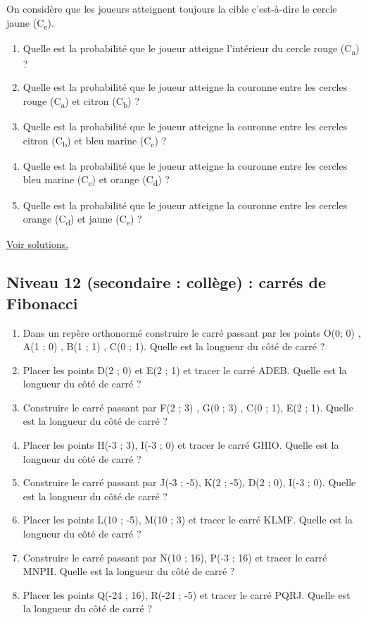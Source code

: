 \documentclass[11pt]{article}
\begin{document}
On considère que les joueurs atteignent toujours la cible c'est-à-dire
le cercle jaune (C\textsubscript{e}).


\begin{enumerate}
\item Quelle est la probabilité que le joueur atteigne l'intérieur du
cercle rouge (C\textsubscript{a}) ?
\item Quelle est la probabilité que le joueur atteigne la couronne entre
les cercles rouge (C\textsubscript{a}) et citron (C\textsubscript{b}) ?
\item Quelle est la probabilité que le joueur atteigne la couronne entre
les cercles citron (C\textsubscript{b}) et bleu marine (C\textsubscript{c}) ?
\item Quelle est la probabilité que le joueur atteigne la couronne entre
les cercles bleu marine (C\textsubscript{c}) et orange (C\textsubscript{d}) ?
\item Quelle est la probabilité que le joueur atteigne la couronne entre
les cercles orange (C\textsubscript{d}) et jaune (C\textsubscript{e}) ?
\end{enumerate}



\hyperref[org474bdb9]{Voir solutions.}

\newpage


\subsection{Niveau 12 (secondaire : collège) : carrés de Fibonacci}
\label{sec:org9273715}

\label{orgfc1cc9c}


\begin{enumerate}
\item Dans un repère orthonormé construire le carré passant par les
points O(0; 0) , A(1 ; 0) , B(1 ; 1) , C(0 ; 1). Quelle est la
longueur du côté de carré ?
\item Placer les points D(2 ; 0) et E(2 ; 1) et tracer le carré
ADEB. Quelle est la longueur du côté de carré ?
\item Construire le carré passant par F(2 ; 3) , G(0 ; 3) , C(0 ; 1), E(2
; 1). Quelle est la longueur du côté de carré ?
\item Placer les points H(-3 ; 3), I(-3 ; 0) et tracer le carré
GHIO. Quelle est la longueur du côté de carré ?
\item Construire le carré passant par J(-3 ; -5), K(2 ; -5), D(2 ;
0), I(-3 ; 0). Quelle est la longueur du côté de carré ?
\item Placer les points L(10 ; -5), M(10 ; 3) et tracer le carré
KLMF. Quelle est la longueur du côté de carré ?
\item Construire le carré passant par N(10 ; 16), P(-3 ; 16) et
tracer le carré MNPH. Quelle est la longueur du côté de carré ?
\item Placer les points Q(-24 ; 16), R(-24 ; -5) et tracer le carré
PQRJ. Quelle est la longueur du côté de carré ?
\end{enumerate}
\end{document}
